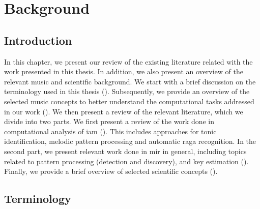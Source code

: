 
\chapter{Background}
\label{chap:background}

\section{Introduction}

In this chapter, we present our review of the existing literature related with the work presented in this thesis. In addition, we also present an overview of the relevant music and scientific background. We start with a brief discussion on the terminology used in this thesis (). Subsequently, we provide an overview of the selected music concepts to better understand the computational tasks addressed in our work (). We then present a review of the relevant literature, which we divide into two parts. We first present a review of the work done in computational analysis of \gls{iam} (). This includes approaches for tonic identification, melodic pattern processing and automatic \gls{raga} recognition. In the second part, we present relevant work done in \gls{mir} in general, including topics related to pattern processing (detection and discovery), and key estimation (). Finally, we provide a brief overview of selected scientific concepts ().%



\section{Terminology}
\label{sec:background_terminology}

